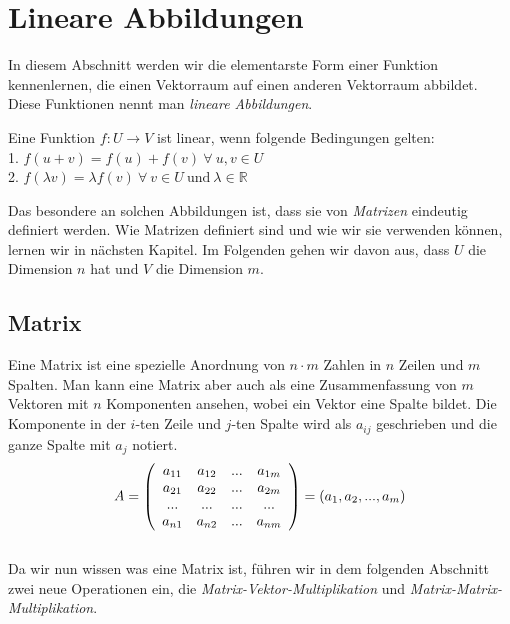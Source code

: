 \section{Lineare Abbildungen}
In diesem Abschnitt werden wir die elementarste Form einer Funktion kennenlernen, die einen Vektorraum auf einen anderen Vektorraum abbildet. Diese Funktionen nennt man \textit{lineare Abbildungen}.
\begin{Def}
	\label{Def:Def_1}
Eine Funktion $f:U \stackrel{}{\rightarrow} V$ ist linear, wenn folgende Bedingungen gelten: \\ 
1. $f(u+v) = f(u)+f(v) \ \forall \ u,v \in U$\\
2. $f(\lambda v) = \lambda f(v) \ \forall \ v \in U \ \text{und} \ \lambda \in \mathbb{R}$
\end{Def}

Das besondere an solchen Abbildungen ist, dass sie von \textit{Matrizen} eindeutig definiert werden. Wie Matrizen definiert sind und wie wir sie verwenden können, lernen wir in nächsten Kapitel. Im Folgenden gehen wir davon aus, dass $U$ die Dimension $n$ hat und $V$ die Dimension $m$. 

\subsection{Matrix}
Eine Matrix ist eine spezielle Anordnung von $n\cdot m$ Zahlen in $n$ Zeilen und $m$ Spalten. Man kann eine Matrix aber auch als eine Zusammenfassung von $m$ Vektoren mit $n$ Komponenten ansehen, wobei ein Vektor eine Spalte bildet. Die Komponente in der $i$-ten Zeile und $j$-ten Spalte wird als $a_{ij}$ geschrieben und die ganze Spalte mit $a_j$ notiert.\\
\begin{equation*}
A= \left(
   \begin{array}{cccc}
	  a_{11} & a_{12} & ... & a_{1m}\\
		a_{21} & a_{22} & ... & a_{2m}\\
		...   & ...   & ... & ...  \\
		a_{n1} & a_{n2} & ... & a_{nm}
	 \end{array}
	 \right) = (a_1, a_2, ..., a_m)\\
\end{equation*}
\\
Da wir nun wissen was eine Matrix ist, führen wir in dem folgenden Abschnitt zwei neue Operationen ein, die \textit{Matrix-Vektor-Multiplikation} und \textit{Matrix-Matrix-Multiplikation}.

